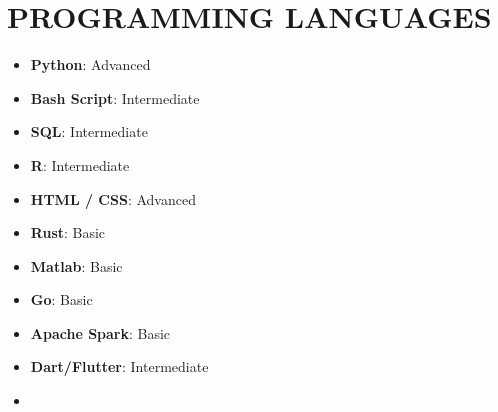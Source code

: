 \documentclass[11 pt,oneside,a4paper,titlepage]{article}
\begin{document}
{\begin{minipage}{11.3cm}

    


    \vspace*{0.22cm}

    
    \section*{\textcolor{mitred}{{\faCode} PROGRAMMING LANGUAGES}}
    \vspace*{-0.5cm}
    \begin{multicols}{2}    
    \begin{itemize}
    \footnotesize
        \item \textbf{Python}: Advanced
        \item \textbf{Bash Script}: Intermediate
        \item \textbf{SQL}: Intermediate
        \item \textbf{R}: Intermediate 
        \item \textbf{HTML / CSS}: Advanced
        \item \textbf{Rust}: Basic
        \item \textbf{Matlab}: Basic
        \item \textbf{Go}: Basic
        \item \textbf{Apache Spark}: Basic
        \item \textbf{Dart/Flutter}: Intermediate 
        \item[\vspace{\fill}]
    \end{itemize}
    \end{multicols}
    

\end{minipage}}
\end{document}
